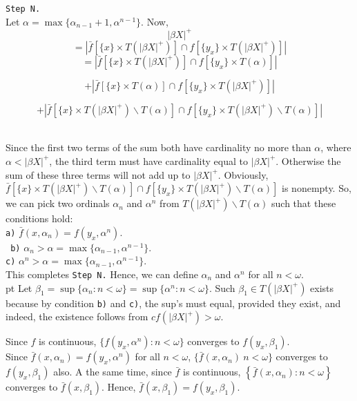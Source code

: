\documentclass{article}
\begin{document}
\texttt{Step N.}\\ Let $\alpha=\max\{\alpha_{n-1}+1,\alpha^{n-1}\}.$ Now,  \vskip 10pt    
$$|\beta X|^+ $$
    $$= \left| \bar{f}\left[\{x\}\times T(|\beta X|^+)\right] \cap f\left[\{y_x\} \times T(|\beta X |^+)\right]\right|$$
    $$=\left| \bar{f}\left[\{x\}\times T(|\beta X|^+)\right] \cap f\left[\{y_x\} \times T(\alpha)\right]\right|$$
    
    $$+\left| \bar{f}\left[\{x\}\times T(\alpha)\right] \cap f\left[\{y_x\} \times T(|\beta X |^+)\right]\right|$$
    
    $$+\left| \bar{f}\left[\{x\}\times T(|\beta X|^+)\backslash T(\alpha)\right] \cap f\left[\{y_x\} \times T(|\beta X |^+)\backslash T(\alpha)\right]\right|$$\\

\vskip 10pt

Since the first two terms of the sum both have cardinality no more than $\alpha$, where $\alpha <|\beta X|^+$, the third term must have cardinality equal to $|\beta X|^+$. Otherwise the sum of these three terms will not add up to $|\beta X|^+$. Obviously, $\bar{f}[\{x\}\times T(|\beta X|^+)\backslash T(\alpha)] \cap f[\{y_x\} \times T(|\beta X |^+)\backslash T(\alpha)] $ is nonempty. So, we can pick two ordinals $\alpha_n$ and $\alpha^n$ from $T(|\beta X|^+)\backslash T(\alpha)$ such that these conditions hold: \\
	\texttt{a)} $\bar{f}(x,\alpha_n)=f(y_x,\alpha^n)$.	\\	
\texttt{	b)} $\alpha_n> \alpha= \max\{\alpha_{n-1}, \alpha^{n-1}\}$.\\	
	\texttt{c)} $\alpha^n> \alpha= \max\{\alpha_{n-1}, \alpha^{n-1}\}$.\\
	
This completes \texttt{Step N.} Hence, we can define $\alpha_n$ and $\alpha^n$ for all $n<\omega$.\\
 pt
 Let $\beta_1=\sup\{\alpha_n:n<\omega\}=\sup\{\alpha^n: n<\omega \}.$ Such $\beta_1\in T(|\beta X|^+)$ exists because by condition \texttt{b)} and \texttt{c)}, the sup's must equal, provided they exist, and indeed, the existence follows from $cf(|\beta X|^+) > \omega$. 
 
\vskip 15pt 
 
Since $f$ is continuous, $\{f(y_x,\alpha^n): n<\omega\}$ converges to $f(y_x,\beta_1)$.\\
Since $\bar{f}(x,\alpha_n)=f(y_x,\alpha^n)$ for all $n<\omega$, $\{\bar{f}(x,\alpha_n)\: n<\omega\}$ converges to $f(y_x,\beta_1)$ also. A the same time, since $\bar{f}$ is continuous, $\left\{\bar{f}(x,\alpha_n): n<\omega\right\}$ converges to $\bar{f}(x,\beta_1).$ Hence, $\bar{f}(x, \beta_1)=f(y_x,\beta_1).$
\end{document}
